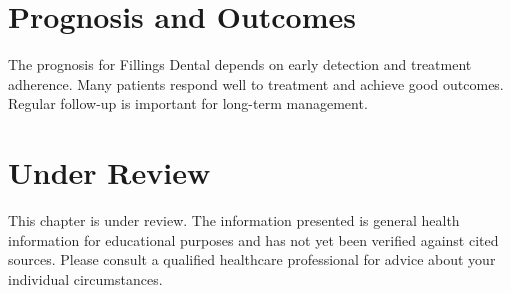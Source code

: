 \section*{Prognosis and Outcomes}
The prognosis for Fillings Dental depends on early detection and treatment adherence. Many patients respond well to treatment and achieve good outcomes. Regular follow-up is important for long-term management.
\section*{Under Review}
This chapter is under review. The information presented is general health information for educational purposes and has not yet been verified against cited sources. Please consult a qualified healthcare professional for advice about your individual circumstances.


\clearpage
